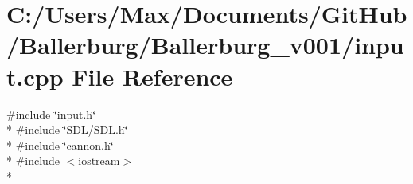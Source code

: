 \section{C\+:/\+Users/\+Max/\+Documents/\+Git\+Hub/\+Ballerburg/\+Ballerburg\+\_\+v001/input.cpp File Reference}
\label{input_8cpp}
{\ttfamily \#include \char`\"{}input.\+h\char`\"{}}\\*
{\ttfamily \#include \char`\"{}S\+D\+L/\+S\+D\+L.\+h\char`\"{}}\\*
{\ttfamily \#include \char`\"{}cannon.\+h\char`\"{}}\\*
{\ttfamily \#include $<$iostream$>$}\\*

